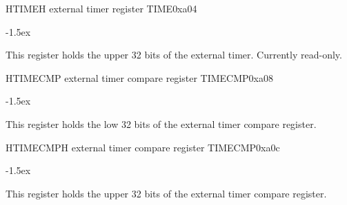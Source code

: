 \documentclass[12pt]{article}
\begin{document}
\begin{register}{H}{TIMEH external timer register TIME}{0xa04}
\label{timeh}
\regnewline%
\end{register}
\begin{regdesc}[0.8\textwidth]\begin{reglist}[00000]
\itemsep-1.5ex
\item [TIMEH] This register holds the upper 32 bits of the external timer. Currently read-only.
\end{reglist}\end{regdesc}

\begin{register}{H}{TIMECMP external timer compare register TIMECMP}{0xa08}
\label{timecmp}
\regnewline%
\end{register}
\begin{regdesc}[0.8\textwidth]\begin{reglist}[00000000]
\itemsep-1.5ex
\item [TIMECMP] This register holds the low 32 bits of the external timer compare register.
\end{reglist}\end{regdesc}

\begin{register}{H}{TIMECMPH external timer compare register TIMECMP}{0xa0c}
\label{timecmph}
\regnewline%
\end{register}
\begin{regdesc}[0.8\textwidth]\begin{reglist}[000000000]
\itemsep-1.5ex
\item [TIMECMPH] This register holds the upper 32 bits of the external timer compare register.
\end{reglist}\end{regdesc}
\end{document}

